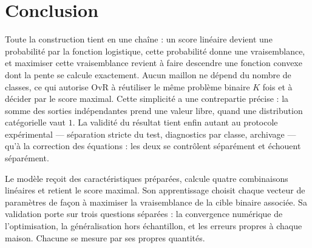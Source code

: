 \chapter*{Conclusion}

Toute la construction tient en une chaîne : un score linéaire devient une
probabilité par la fonction logistique, cette probabilité donne une
vraisemblance, et maximiser cette vraisemblance revient à faire descendre une
fonction convexe dont la pente se calcule exactement. Aucun maillon ne dépend du
nombre de classes, ce qui autorise OvR à réutiliser le même problème binaire $K$
fois et à décider par le score maximal. Cette simplicité a une contrepartie
précise : la somme des sorties indépendantes prend une valeur libre, quand une
distribution catégorielle vaut $1$. La validité du résultat tient enfin autant au
protocole expérimental --- séparation stricte du test, diagnostics par classe,
archivage --- qu'à la correction des équations : les deux se contrôlent
séparément et échouent séparément.

\begin{resultat}
Le modèle reçoit des caractéristiques préparées, calcule quatre combinaisons
linéaires et retient le score maximal. Son apprentissage choisit chaque vecteur
de paramètres de façon à maximiser la vraisemblance de la cible binaire associée.
Sa validation porte sur trois questions séparées : la convergence numérique de
l'optimisation, la généralisation hors échantillon, et les erreurs propres à
chaque maison. Chacune se mesure par ses propres quantités.
\end{resultat}
